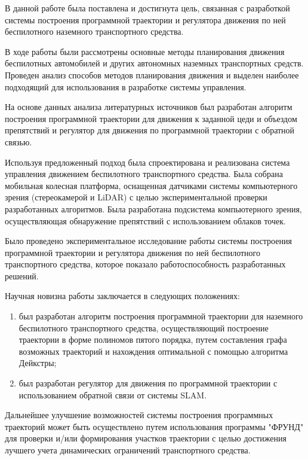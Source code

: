 
В данной работе была поставлена и достигнута цель, связанная с разработкой системы построения программной траектории
и регулятора движения по ней беспилотного наземного транспортного средства.

В ходе работы были рассмотрены основные методы планирования движения беспилотных автомобилей и других автономных
наземных транспортных средств. Проведен анализ способов методов планирования движения и выделен наиболее подходящий
для использования в разработке системы управления.

На основе данных анализа литературных источников был разработан алгоритм построения программной траектории для
движения к заданной цеди и объездом препятствий и регулятор для движения по программной траектории с обратной связью.

Используя предложенный подход была спроектирована и реализована система управления движением беспилотного транспортного
средства. Была собрана мобильная колесная платформа, оснащенная датчиками  системы компьютерного зрения
(стереокамерой и LiDAR) с целью экспериментальной проверки разработанных алгоритмов. Была разработана подсистема
компьютерного зрения, осуществляющая обнаружение препятствий с использованием облаков точек.

Было проведено экспериментальное исследование работы системы построения программной траектории и регулятора движения
по ней беспилотного транспортного средства, которое показало работоспособность разработанных решений.

Научная новизна работы заключается в следующих положениях:
\begin{enumerate}
    \item был разработан алгоритм построения программной траектории для наземного беспилотного транспортного
          средства, осуществляющий построение траектории в форме полиномов пятого порядка, путем составления
          графа возможных траекторий и нахождения оптимальной с помощью алгоритма Дейкстры;
    \item был разработан регулятор для движения по программной траектории с использованием обратной связи
          от системы SLAM.
\end{enumerate}

Дальнейшее улучшение возможностей системы построения программных траекторий может быть осуществлено путем использования
программы "ФРУНД" для проверки и/или формирования участков траектории с целью достижения лучшего учета динамических
ограничений транспортного средства.